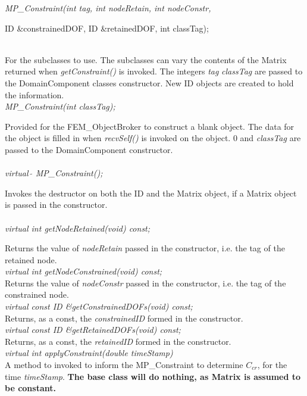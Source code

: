 {\em MP\_Constraint(int tag, int nodeRetain, int nodeConstr, 

\indent\indent\indent\indent\indent\indent ID \&constrainedDOF, ID
\&retainedDOF, int classTag);}\\
For the subclasses to use. The subclasses can vary the contents of the
Matrix returned when {\em getConstraint()} is invoked. 
The integers {\em tag} {\em classTag} are
passed to the DomainComponent classes constructor. New ID objects are
created to hold the information. \\

{\em MP\_Constraint(int classTag);} 

Provided for the FEM\_ObjectBroker to construct a blank object. The
data for the object is filled in when {\em recvSelf()} is invoked on
the object. $0$ and {\em classTag} are passed to the DomainComponent
constructor. \\ 

  \\
{\em virtual~$\tilde{}$ MP\_Constraint();} 

Invokes the destructor on both the ID and the Matrix object, if a
Matrix object is passed in the constructor. \\

  \\
{\em virtual int getNodeRetained(void) const; } 

Returns the value of {\em nodeRetain} passed in the constructor,
i.e. the tag of the retained node. \\

{\em virtual int getNodeConstrained(void) const;    }\\
Returns the value of {\em nodeConstr} passed in the constructor, i.e. the
tag of the constrained node. \\

{\em virtual const ID \&getConstrainedDOFs(void) const;   }\\     
Returns, as a const, the {\em constrainedID} formed in the constructor. \\

{\em virtual const ID \&getRetainedDOFs(void) const;   }\\     
Returns, as a const, the {\em retainedID} formed in the
constructor. \\

{\em virtual int applyConstraint(double timeStamp)}\\     
A method to invoked to inform the MP\_Constraint to determine $C_{cr}$,
for the time {\em timeStamp}. {\bf The base class will do nothing, as
Matrix is assumed to be constant.} \\

